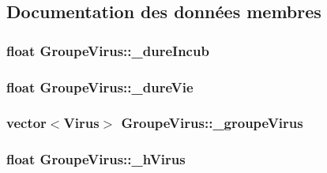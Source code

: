 \subsection{Documentation des données membres}
\hypertarget{classGroupeVirus_a8c846fa3dd506b3e43a03544955627e4}{
\subsubsection[{\_\-dureIncub}]{\setlength{\rightskip}{0pt plus 5cm}float {\bf GroupeVirus::\_\-dureIncub}}}
\label{classGroupeVirus_a8c846fa3dd506b3e43a03544955627e4}
\hypertarget{classGroupeVirus_a13542f122af386a801801e16fc932358}{
\subsubsection[{\_\-dureVie}]{\setlength{\rightskip}{0pt plus 5cm}float {\bf GroupeVirus::\_\-dureVie}}}
\label{classGroupeVirus_a13542f122af386a801801e16fc932358}
\hypertarget{classGroupeVirus_adfe8a98a8c6dffc0516223109d038ad4}{
\subsubsection[{\_\-groupeVirus}]{\setlength{\rightskip}{0pt plus 5cm}vector$<${\bf Virus}$>$ {\bf GroupeVirus::\_\-groupeVirus}}}
\label{classGroupeVirus_adfe8a98a8c6dffc0516223109d038ad4}
\hypertarget{classGroupeVirus_a89251826c73f002fcb5c7c6f74a9c9b4}{
\subsubsection[{\_\-hVirus}]{\setlength{\rightskip}{0pt plus 5cm}float {\bf GroupeVirus::\_\-hVirus}}}
\label{classGroupeVirus_a89251826c73f002fcb5c7c6f74a9c9b4}
